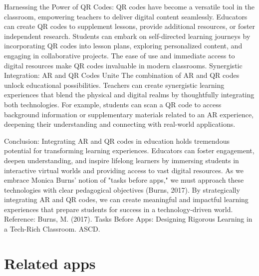 Harnessing the Power of \ac{QR} Codes: \ac{QR} codes have become a versatile tool in the classroom, empowering teachers to deliver digital content seamlessly. Educators can create \ac{QR} codes to supplement lessons, provide additional resources, or foster independent research. Students can embark on self-directed learning journeys by incorporating \ac{QR} codes into lesson plans, exploring personalized content, and engaging in collaborative projects. The ease of use and immediate access to digital resources make \ac{QR} codes invaluable in modern classrooms.
Synergistic Integration: \ac{AR} and \ac{QR} Codes Unite The combination of \ac{AR} and \ac{QR} codes unlock educational possibilities. Teachers can create synergistic learning experiences that blend the physical and digital realms by thoughtfully integrating both technologies. For example, students can scan a \ac{QR} code to access background information or supplementary materials related to an \ac{AR} experience, deepening their understanding and connecting with real-world applications.

Conclusion: Integrating \ac{AR} and \ac{QR} codes in education holds tremendous potential for transforming learning experiences. Educators can foster engagement, deepen understanding, and inspire lifelong learners by immersing students in interactive virtual worlds and providing access to vast digital resources. As we embrace Monica Burns' notion of "tasks before apps," we must approach these technologies with clear pedagogical objectives (Burns, 2017). By strategically integrating \ac{AR} and \ac{QR} codes, we can create meaningful and impactful learning experiences that prepare students for success in a technology-driven world.
Reference: Burns, M. (2017). Tasks Before Apps: Designing Rigorous Learning in a Tech-Rich Classroom. ASCD.
\section{Related apps}


